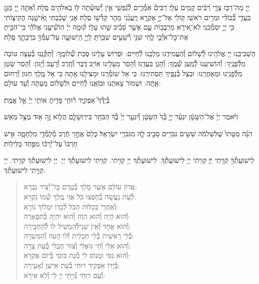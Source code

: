 \documentclass[twoside, openany, parskip=half, 11pt]{book}
\begin{document}
יְ֖יָ מָה־רַבּ֣וּ צָרָ֑י רַ֝בִּ֗ים קָמִ֥ים עָלָֽי׃ רַבִּים֘ אֹֽמְ֯רִ֢ים לְ֯נַ֫פְשִׁ֥י אֵ֤ין יְ֯שֽׁוּעָ֓תָה לּ֖וֹ בֵֽאלֹהִ֣ים סֶֽלָה׃ וְ֯אַתָּ֣ה יְ֖יָ מָגֵ֥ן בַּֽעֲדִ֑י כְּ֝֯בוֹדִ֗י וּמֵרִ֥ים רֹאשִֽׁי׃ ק֭וֹלִֽי אֶל־יְיָ֣ אֶקְרָ֑א וַיַּֽעֲנֵ֙נִי מֵהַ֖ר קָדְ֯שׁ֣וֹ סֶֽלָה׃ אֲנִ֥י שָׁכַ֗בְתִּי וָֽאִ֫ישָׁ֥נָה הֱקִיצ֑וֹתִי כִּ֖י יְיָ֣ יִסְמְ֯כֵֽנִי׃ לֹֽא־אִ֭ירָא מֵרִֽבֲב֥וֹת עָ֑ם אֲשֶׁ֥ר סָ֝בִ֗יב שָׁ֣תוּ עָלָֽי׃ ק֘וּמָ֤ה יְיָ֨ הֽוֹשִׁ֘יעֵ֤נִי אֱלֹהַ֗י כִּֽי־הִכִּ֣יתָ אֶת־כׇּל־אֹֽיְ֯בַ֣י לֶ֑חִי שִׁנֵּ֖י רְ֯שָׁעִ֣ים שִׁבַּֽרְתָּ׃ לַֽיְיָ֥ הַיְשׁוּעָ֑ה עַל־עַמְּ֯ךָ֖ בִרְכָתֶ֣ךָ סֶּֽלָה׃

הַשְׁכִּיבֵֽנוּ יְיָ אֱלֹהֵֽינוּ לְ֯שָׁלוֹם וְ֯הַעֲמִידֵֽנוּ מַלְכֵּֽנוּ לְ֯חַיִּים: וּפְרוֹשׂ עָלֵֽינוּ סֻכַּת שְׁ֯לוֹמֶֽךָ: וְ֯תַקְּ֯נֵֽנוּ בְּ֯עֵצָה טוֹבָה מִלְּ֯פָנֶֽיךָ: וְ֯הוֹשִׁיעֵֽנוּ לְ֯מַֽעַן שְׁ֯מֶֽךָ: וְ֯הָגֵן בַּעֲדֵֽנוּ וְ֯הָסֵר מֵעָלֵֽינוּ אוֹיֵב דֶּֽבֶר וְ֯חֶֽרֶב וְ֯רָעָב וְ֯יָגוֹן: וְ֯הָסֵר שָׂטָן מִלְּ֯פָנֵֽינוּ וּמֵאַחֲרֵֽנוּ: וּבְצֵל כְּ֯נָפֶֽיךָ תַּסְתִּירֵֽנוּ: כִּי אֵל שׁוֹמְ֯רֵֽנוּ וּמַצִּילֵֽנוּ אַֽתָּה כִּי אֵל מֶֽלֶךְ חַנּוּן וְ֯רַחוּם אַֽתָּה: וּשְׁמוֹר צֵאתֵֽנוּ וּבוֹאֵֽנוּ לְ֯חַיִּים וּלְשָׁלוֹם מֵעַתָּה וְ֯עַד עוֹלָם:

בְּ֯יָדְ֯ךָ֮ אַפְקִ֢יד ר֫וּחִ֥י פָּדִ֖יתָ אוֹתִ֥י יְיָ֗ אֵ֣ל אֱמֶֽת׃

וַיֹּ֨אמֶר יְיָ֜ אֶל־הַשָּׂטָ֗ן יִגְעַ֨ר יְיָ֤ בְּ֯ךָ֙ הַשָּׂטָ֔ן וְ֯יִגְעַ֤ר יְיָ֙ בְּ֯ךָ֔ הַבֹּחֵ֖ר בִּירֽוּשָׁלָ֑םִ הֲל֧וֹא זֶ֦ה א֖וּד מֻצָּ֥ל מֵאֵֽשׁ׃

הִנֵּ֗ה מִטָּתוֹ֙ שֶׁלִּשְׁלֹמֹ֔ה שִׁשִּׁ֥ים גִּבֹּרִ֖ים סָבִ֣יב לָ֑הּ מִגִּבֹּרֵ֖י יִשְׂרָאֵֽל׃ כֻּלָם֙ אֲחֻ֣זֵי חֶ֔רֶב מְ֯לֻמְּ֯דֵ֖י מִלְחָמָ֑ה אִ֤ישׁ חַרְבּוֹ֙ עַל־יְ֯רֵכ֔וֹ מִפַּ֖חַד בַּלֵּילֽוֹת׃


לִֽישׁוּעָֽתְ֯ךָ֖ קִוִּ֥יתִי יְיָ׃ קִוִּֽיתִי יְיָ לִישׁוּעָתְ֯ךָ. לִישׁוּעָתְ֯ךָ יְיָ קִוִּ֥יתִי. קִוִּ֥יתִי לִישׁוּעָתְ֯ךָ יְיָ. יְיָ לִישׁוּעָתְ֯ךָ קִוִּ֥יתִי. יְיָ קִוִּ֥יתִי לִישׁוּעָתְ֯ךָ.

\vspace{-\baselineskip}
\begin{quote}

אֲדוֹן עוֹלָם אֲשֶׁר מָלַךְ \hfill בְּ֯טֶֽרֶם כׇּל־יְ֯צִיר נִבְרָא:\\
לְ֯עֵת נַעֲשָׂה בְ֯חֶפְצוֹ כֹּל \hfill אֲזַי מֶֽלֶךְ שְׁ֯מוֹ נִקְרָא:\\
וְ֯אַחֲרֵי כִּכְלוֹת הַכֹּל \hfill לְ֯בַדוֹ יִמְלוֹךְ נוֹרָא:\\
וְ֯הוּא הָיָה וְ֯הוּא הוֶֹה \hfill וְ֯הוּא יִהְיֶה בְּ֯תִפְאָרָה:\\
וְ֯הוּא אֶחָד וְ֯אֵין שֵׁנִי\hfill לְ֯הַמְשִׁיל לוֹ לְ֯הַחְבִּֽירָה:\\
בְּ֯לִי רֵאשִׁית בְּ֯לִי תַכְלִית \hfill וְ֯לוֹ הָעוֹז וְ֯הַמִּשְׂרָה:\\
וְ֯הוּא אֵלִי וְ֯חַי גּוֹאֲלִי \hfill וְ֯צוּר חֶבְלִי בְּ֯עֵת צָרָה:\\
וְ֯הוּא נִסִּי וּמָנוֹס לִי \hfill מְ֯נָת כּוֹסִי בְּ֯יוֹם אֶקְרָא:\\
בְּ֯יָדוֹ אַפְקִיד רוּחִי \hfill בְּ֯עֵת אִישַׁן וְ֯אָעִֽירָה:\\
וְ֯עִם רוּחִי גְּ֯וִיָּתִי \hfill יְיָ לִי וְ֯לֹא אִירָא:

\end{quote}
\end{document}
